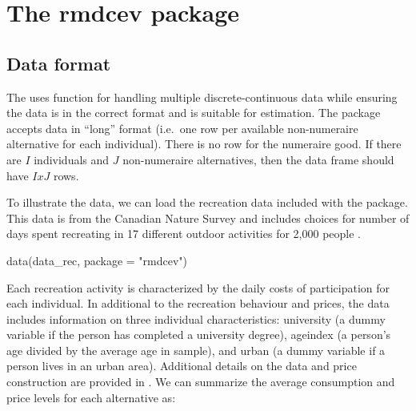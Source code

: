 \hypertarget{rmdcev}{%
\section{The rmdcev package}\label{rmdcev}}

\hypertarget{data-format}{%
\subsection{Data format}\label{data-format}}

The  uses  function for handling multiple
discrete-continuous data while ensuring the data is in the correct
format and is suitable for estimation. The  package accepts
data in ``long'' format (i.e.~one row per available non-numeraire
alternative for each individual). There is no row for the numeraire
good. If there are \(I\) individuals and \(J\) non-numeraire
alternatives, then the data frame should have \(IxJ\) rows.

To illustrate the data, we can load the recreation data included with
the  package. This data is from the Canadian Nature Survey
and includes choices for number of days spent recreating in 17 different
outdoor activities for 2,000 people \citep{federal20122014}.

\begin{Schunk}
\begin{Sinput}
data(data_rec, package = "rmdcev")
\end{Sinput}
\end{Schunk}

Each recreation activity is characterized by the daily costs of
participation for each individual. In additional to the recreation
behaviour and prices, the data includes information on three individual
characteristics: university (a dummy variable if the person has
completed a university degree), ageindex (a person's age divided by the
average age in sample), and urban (a dummy variable if a person lives in
an urban area). Additional details on the data and price construction
are provided in \citet{lloydsmitheconomics2019}. We can summarize the
average consumption and price levels for each alternative as:


